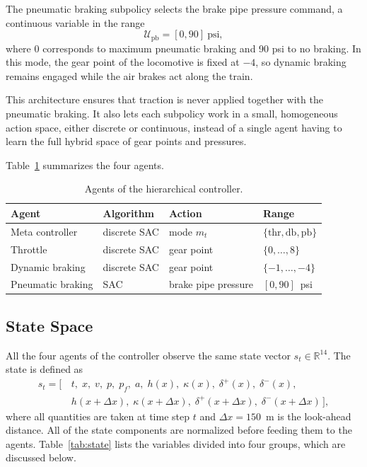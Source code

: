 \documentclass[preprint,10pt]{elsarticle}
\begin{document}
The pneumatic braking subpolicy selects the brake pipe pressure command, a continuous variable in the range
\begin{equation}
    \mathcal{U}_{\text{pb}} = [0, 90]~\text{psi},
\end{equation}
where 0 corresponds to maximum pneumatic braking and 90 psi to no braking. In this mode, the gear point of the locomotive is fixed at $-4$, so dynamic braking remains engaged while the air brakes act along the train. 

This architecture ensures that traction is never applied together with the pneumatic braking. It also lets each subpolicy work in a small, homogeneous action space, either discrete or continuous, instead of a single agent having to learn the full hybrid space of gear points and pressures.

Table~\ref{tab:agents} summarizes the four agents.

\begin{table}[htbp]
    \centering
    \begin{tabular}{llll}
        \toprule
        Agent & Algorithm & Action & Range \\
        \midrule
        Meta controller   & discrete SAC & mode $m_t$          & $\{\text{thr}, \text{db}, \text{pb}\}$ \\
        Throttle          & discrete SAC & gear point          & $\{0, \dots, 8\}$ \\
        Dynamic braking   & discrete SAC & gear point          & $\{-1, \dots, -4\}$ \\
        Pneumatic braking & SAC          & brake pipe pressure & $[0, 90]$~psi \\
        \bottomrule
    \end{tabular}
    \caption{Agents of the hierarchical controller.}
    \label{tab:agents}
\end{table}

\subsection{State Space} \label{sec:state}

All the four agents of the controller observe the same state vector $s_t \in \mathbb{R}^{14}$. The state is defined as
\begin{equation}
    \begin{split}
        s_t = \big[\, & t,\; x,\; v,\; p,\; p_f,\; a,\; h(x),\; \kappa(x),\; \delta^{+}(x),\; \delta^{-}(x),\\
        & h(x + \Delta x),\; \kappa(x + \Delta x),\; \delta^{+}(x + \Delta x),\; \delta^{-}(x + \Delta x) \,\big],
    \end{split}
    \label{eq:state}
\end{equation}
where all quantities are taken at time step $t$ and $\Delta x = 150$~m is the look-ahead distance. All of the state components are normalized before feeding them to the agents. Table~\ref{tab:state} lists the variables divided into four groups, which are discussed below.
\end{document}
